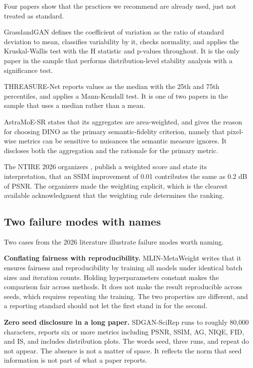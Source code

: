 \documentclass{interact}
\begin{document}
Four papers show that the practices we recommend are already used, just not treated as standard.

GrasslandGAN \citep{noayarasca2026} defines the coefficient of variation as the ratio of standard deviation to mean, classifies variability by it, checks normality, and applies the Kruskal-Wallis test with the H statistic and p-values throughout. It is the only paper in the sample that performs distribution-level stability analysis with a significance test.

THREASURE-Net \citep{kalinicheva2025} reports values as the median with the 25th and 75th percentiles, and applies a Mann-Kendall test. It is one of two papers in the sample that uses a median rather than a mean.

AstraMoE-SR \citep{lai2026} states that its aggregates are area-weighted, and gives the reason for choosing DINO as the primary semantic-fidelity criterion, namely that pixel-wise metrics can be sensitive to nuisances the semantic measure ignores. It discloses both the aggregation and the rationale for the primary metric.

The NTIRE 2026 organizers \citep{chen2026}, \citep{liu2026b} publish a weighted score and state its interpretation, that an SSIM improvement of 0.01 contributes the same as 0.2 dB of PSNR. The organizers made the weighting explicit, which is the clearest available acknowledgment that the weighting rule determines the ranking.

\subsection{Two failure modes with names}\label{sec:failures}

Two cases from the 2026 literature illustrate failure modes worth naming.

\textbf{Conflating fairness with reproducibility.} MLIN-MetaWeight \citep{zhang2026} writes that it ensures fairness and reproducibility by training all models under identical batch sizes and iteration counts. Holding hyperparameters constant makes the comparison fair across methods. It does not make the result reproducible across seeds, which requires repeating the training. The two properties are different, and a reporting standard should not let the first stand in for the second.

\textbf{Zero seed disclosure in a long paper.} SDGAN-SciRep \citep{wang2026} runs to roughly 80,000 characters, reports six or more metrics including PSNR, SSIM, AG, NIQE, FID, and IS, and includes distribution plots. The words seed, three runs, and repeat do not appear. The absence is not a matter of space. It reflects the norm that seed information is not part of what a paper reports.
\end{document}
